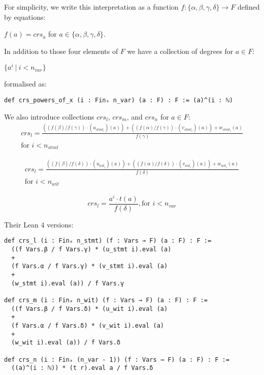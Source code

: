 \documentclass{article}
\theoremstyle{definition}
\theoremstyle{remark}
\begin{document}
For simplicity, we write this interpretation as a function $f :  \{ \alpha,\beta,\gamma, \delta \} \to F$ defined by equations:
\begin{center}
$f(a) = crs_{a}$ for $a \in \{ \alpha,\beta,\gamma, \delta \}$.
\end{center}

In addition to those four elements of $F$ we have a collection of degrees for $a \in F$:
\begin{center}
$\{ a^i \: | \: i < n_{var} \}$
\end{center}
formalised as:
\begin{lstlisting}
def crs_powers_of_x (i : Finₓ n_var) (a : F) : F := (a)^(i : ℕ)
\end{lstlisting}

We also introduce collections $crs_l$, $crs_m$, and $crs_n$ for $a \in F$:
\begin{multline}
crs_l = \frac{((f(\beta) / f(\gamma)) \cdot (u_{{stmt}_i})(a)) + ((f(\alpha) / f(\gamma)) \cdot (v_{{stmt}_i})(a)) + w_{{stmt}_i}(a)}{f(\gamma)} \\ \text{for $i < n_{stmt}$}
\end{multline}

\begin{multline}
crs_l = \frac{((f(\beta) / f(\delta)) \cdot (u_{{wit}_i})(a)) + ((f(\alpha) / f(\delta)) \cdot (v_{{wit}_i})(a)) + w_{{wit}_i}(a)}{f(\delta)} \\ \text{for $i < n_{wit}$}
\end{multline}

\begin{equation}
crs_l = \frac{a^i \cdot t(a)}{f(\delta)}, \text{for $i < n_{var}$}
\end{equation}

Their Lean 4 versions:

\begin{lstlisting}
def crs_l (i : Finₓ n_stmt) (f : Vars → F) (a : F) : F :=
  ((f Vars.β / f Vars.γ) * (u_stmt i).eval (a)
  +
  (f Vars.α / f Vars.γ) * (v_stmt i).eval (a)
  +
  (w_stmt i).eval (a)) / f Vars.γ

def crs_m (i : Finₓ n_wit) (f : Vars → F) (a : F) : F :=
  ((f Vars.β / f Vars.δ) * (u_wit i).eval (a)
  +
  (f Vars.α / f Vars.δ) * (v_wit i).eval (a)
  +
  (w_wit i).eval (a)) / f Vars.δ

def crs_n (i : Finₓ (n_var - 1)) (f : Vars → F) (a : F) : F :=
  ((a)^(i : ℕ)) * (t r).eval a / f Vars.δ
\end{lstlisting}
\end{document}
